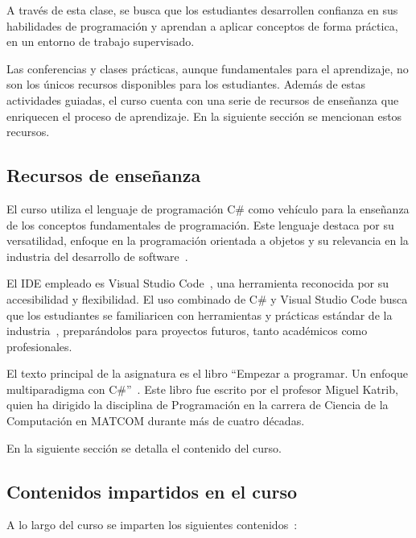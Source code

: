 A través de esta clase, se busca que los estudiantes desarrollen confianza en sus habilidades de programación y aprendan a aplicar conceptos de forma práctica, en un entorno de trabajo supervisado.

Las conferencias y clases prácticas, aunque fundamentales para el aprendizaje, no son los únicos recursos disponibles para los estudiantes. Además de estas actividades guiadas, el curso cuenta con una serie de recursos de enseñanza que enriquecen el proceso de aprendizaje. En la siguiente sección se mencionan estos recursos.

\subsection{Recursos de enseñanza}

El curso utiliza el lenguaje de programación C\# como vehículo para la enseñanza de los conceptos fundamentales de programación. Este lenguaje destaca por su versatilidad, enfoque en la programación orientada a objetos y su relevancia en la industria del desarrollo de software~\cite{microsoft-docs, Albahari2017, Troelsen2021}.

El IDE empleado es Visual Studio Code~\cite{vscode}, una herramienta reconocida por su accesibilidad y flexibilidad. El uso combinado de C\# y Visual Studio Code busca que los estudiantes se familiaricen con herramientas y prácticas estándar de la industria~\cite{microsoft-docs}, preparándolos para proyectos futuros, tanto académicos como profesionales.

El texto principal de la asignatura es el libro ``Empezar a programar. Un enfoque multiparadigma con C\#''~\cite{katrib_programar}. Este libro fue escrito por el profesor Miguel Katrib, quien ha dirigido la disciplina de Programación en la carrera de Ciencia de la Computación en \mbox{MATCOM} durante más de cuatro décadas.

En la siguiente sección se detalla el contenido del curso.

\subsection{Contenidos impartidos en el curso}  

A lo largo del curso se imparten los siguientes contenidos~\cite{plan_estudio_e_2017}:

